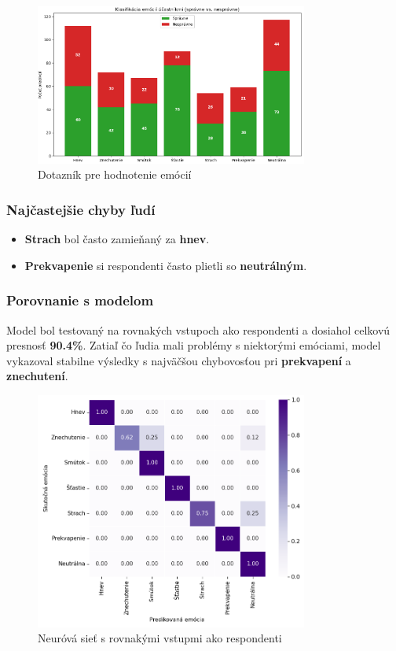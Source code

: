 \begin{figure}[!htpb]
\centering
    \includegraphics[width=0.8\textwidth]{img/experiments/google_form.png}
    \caption{Dotazn\'ik pre hodnotenie em\'oci\'i}
    \label{fig:google_form}
\end{figure}
\subsubsection{Naj\v{c}astej\v{s}ie chyby \v{l}ud\'i}
\begin{itemize}
    \item \textbf{Strach} bol \v{c}asto zamie\v{n}an\'y za \textbf{hnev}.
    \item \textbf{Prekvapenie} si respondenti \v{c}asto plietli so \textbf{neutr\'aln\'ym}.
\end{itemize}

\subsubsection{Porovnanie s modelom}
Model bol testovan\'y na rovnak\'ych vstupoch ako respondenti a dosiahol celkov\'u presnos\v{t} \textbf{90.4\%}. Zatia\v{l} \v{c}o \v{l}udia mali probl\'emy s niektor\'ymi em\'ociami, model vykazoval stabilne v\'ysledky s najv\"a\v{c}\v{s}ou chybovos\v{t}ou pri \textbf{prekvapen\'i} a \textbf{znechuten\'i}.
\begin{figure}[!htpb]
    \centering
    \includegraphics[width=0.8\textwidth]{img/experiments/confusion_nn_google_data.png}
    \caption{Neur\'ov\'a sie\v{t} s rovnak\'ymi vstupmi ako respondenti}
    \label{fig:nn_google_data}
\end{figure}
